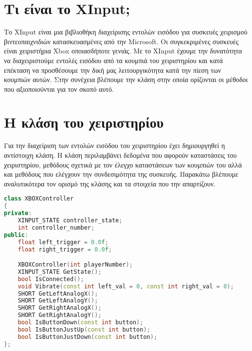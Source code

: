 



\section{Τι είναι το XInput;}
Το XInput είναι μια βιβλιοθήκη διαχείρισης εντολών εισόδου για
συσκευές χειρισμού βιντεοπαιχνιδιών κατασκευασμένες από την Microsoft.
Οι συγκεκριμένες συσκευές είναι χειριστήρια Xbox οποιασδήποτε γενιάς. Με
το XInput έχουμε την δυνατότητα να διαχειριστούμε εντολές εισόδου από τα
κουμπιά του χειριστηρίου και κατά επέκταση να προσθέσουμε την δική μας λειτουργικότητα
κατά την πίεση των κουμπιών αυτών. Στην συνέχεια βλέπουμε την κλάση στην οποία ορίζονται
οι μέθοδοι που αξιοποιούνται για τον σκοπό αυτό.

\section{Η κλάση του χειριστηρίου}

Για την διαχείριση των εντολών εισόδου του χειριστηρίου έχει δημιουργηθεί
η αντίστοιχη κλάση. Η κλάση περιλαμβάνει δεδομένα που αφορούν καταστάσεις
του χειριστηρίου, μεθόδους σχετικά με τον έλεγχο καταστάσεων των κουμπιών
του αλλά και μεθόδους που ελέγχουν την συνδεσιμότητα της συσκευής. Παρακάτω
βλέπουμε αναλυτικότερα τον ορισμό της κλάσης και τα στοιχεία που την απαρτίζουν.

\begin{lstlisting}[language=C++, style=cppstyle]
class XBOXController
{
private:
    XINPUT_STATE controller_state;
    int controller_number;
public:
    float left_trigger = 0.0f;
    float right_trigger = 0.0f;

    XBOXController(int playerNumber);
    XINPUT_STATE GetState();
    bool IsConnected();
    void Vibrate(const int left_val = 0, const int right_val = 0);
    SHORT GetLeftAnalogX();
    SHORT GetLeftAnalogY();
    SHORT GetRightAnalogX();
    SHORT GetRightAnalogY();
    bool IsButtonDown(const int button);
    bool IsButtonJustUp(const int button);
    bool IsButtonJustDown(const int button);
};
\end{lstlisting}





\begin{lstlisting}[language=C++, style=cppstyle]
\end{lstlisting}